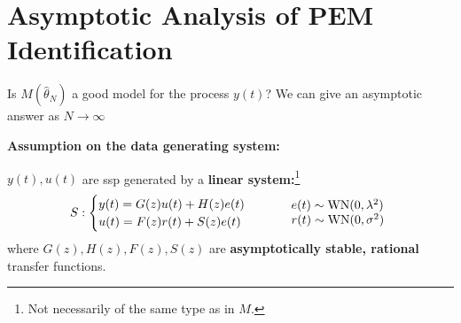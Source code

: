 \section{Asymptotic Analysis of PEM Identification}

Is $M(\hat\theta_{N})$ a good model for the process $y(t)$?
We can give an asymptotic answer as $N\to \infty$

\textbf{Assumption on the data generating system:}

$y(t),u(t)$ are \gls{ssp} generated by a \textbf{linear system:}\footnote{Not necessarily of the same type as in $M$.}
\[
	S:
	\begin{cases}
		y(t) = G(z)u(t) + H(z)e(t)\\
		u(t) = F(z)r(t) + S(z)e(t)
	\end{cases}
	\qquad
	\begin{array}{l}
		e(t)\sim \operatorname{WN}(0,\lambda^2)\\
		r(t)\sim \operatorname{WN}(0,\sigma^2)
	\end{array}
\]
where $G(z),H(z),F(z),S(z)$ are \textbf{asymptotically stable, rational} transfer functions.

